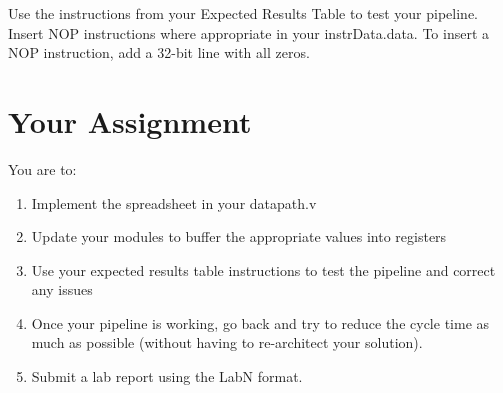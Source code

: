 Use the instructions from your Expected Results Table to test your pipeline.  Insert NOP instructions where appropriate in your instrData.data.  To insert a NOP instruction, add a 32-bit line with all zeros.

\section{Your Assignment}

You are to:
\begin{enumerate}
\item Implement the spreadsheet in your datapath.v
\item Update your modules to buffer the appropriate values into registers
\item Use your expected results table instructions to test the pipeline and correct any issues
\item Once your pipeline is working, go back and try to reduce the cycle time as much as possible (without having to re-architect your solution).
\item Submit a lab report using the LabN format.
\end{enumerate} 